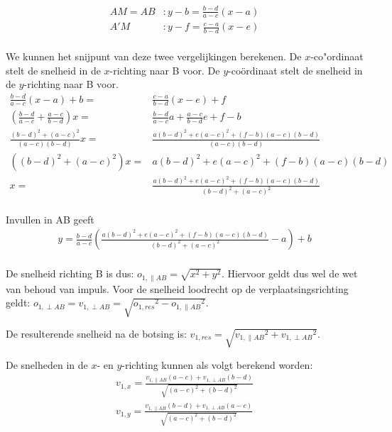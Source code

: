 \documentclass[12pt,a4paper]{article}
\begin{document}
	\begin{equation}
		\begin{aligned}
			AM=AB&: y-b=\frac{b-d}{a-c}\left(x-a\right)\\
			A'M&: y-f=\frac{c-a}{b-d}\left(x-e\right)\\
		\end{aligned}
	\end{equation}

	We kunnen het snijpunt van deze twee vergelijkingen berekenen. De $x$-co"{o}rdinaat stelt de snelheid in de $x$-richting naar B voor. De $y$-co\"{o}rdinaat stelt de snelheid in de $y$-richting naar B voor.
	\begin{equation}
		\begin{aligned}
			\frac{b-d}{a-c}\left(x-a\right)+b=&\frac{c-a}{b-d}\left(x-e\right)+f\\
			\left(\frac{b-d}{a-c}+\frac{a-c}{b-d}\right)x=&\frac{b-d}{a-c}a+\frac{a-c}{b-d}e+f-b\\
			\frac{(b-d)^2+(a-c)^2}{(a-c)(b-d)}x=&\frac{a(b-d)^2+e(a-c)^2+(f-b)(a-c)(b-d)}{(a-c)(b-d)}\\
			\left((b-d)^2+(a-c)^2\right)x=&a(b-d)^2+e(a-c)^2+(f-b)(a-c)(b-d)\\
			x=&\frac{a(b-d)^2+e(a-c)^2+(f-b)(a-c)(b-d)}{(b-d)^2+(a-c)^2}\\
		\end{aligned}
	\end{equation}

	Invullen in AB geeft 
	\begin{equation}
		\begin{aligned}
			y=\frac{b-d}{a-c}\left(\frac{a(b-d)^2+e(a-c)^2+(f-b)(a-c)(b-d)}{(b-d)^2+(a-c)^2}-a\right)+b\\
		\end{aligned}
	\end{equation}

	De snelheid richting B is dus: $o_{1, \parallel AB}=\sqrt{x^2+y^2}$. Hiervoor geldt dus wel de wet van behoud van impuls. Voor de snelheid loodrecht op de verplaatsingsrichting geldt: $o_{1, \perp AB}=v_{1, \perp AB}=\sqrt{{o_{1, res}}^2-{o_{1, \parallel AB}}^2}$.
	
	De resulterende snelheid na de botsing is: $v_{1, res}=\sqrt{{v_{1, \parallel AB}}^2+{v_{1, \perp AB}}^2}$.

	De snelheden in de $x$- en $y$-richting kunnen als volgt berekend worden:
	\begin{equation}
		\begin{aligned}
			v_{1, x}=\frac{v_{1, \parallel AB}\left(a-c\right)+v_{1, \perp AB}\left(b-d\right)}{\sqrt{\left(a-c\right)^2+\left(b-d\right)^2}}\\
			v_{1, y}=\frac{v_{1,  \parallel AB}\left(b-d\right)+v_{1, \perp AB}\left(a-c\right)}{\sqrt{\left(a-c\right)^2+\left(b-d\right)^2}}\\
		\end{aligned}
	\end{equation}
\end{document}
